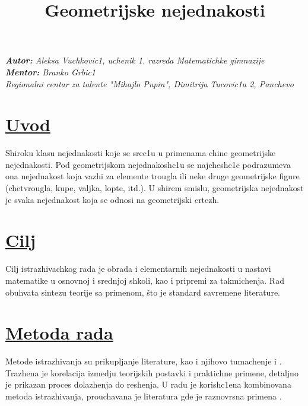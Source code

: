 \documentclass{article}
\title{\textbf{\huge Geometrijske nejednakosti}}
\date{}
\begin{document}
\setlength{\columnsep}{1.2cm}
\maketitle
\begin{center}
\vspace*{-1.5cm}
 \large\textit{\textbf{Autor:} Aleksa Vuchkovic1, uchenik 1. razreda Matematichke gimnazije}\\
    \textit{\textbf{Mentor:} Branko Grbic1}\\
    \normalsize\textit{Regionalni centar za talente "Mihajlo Pupin", Dimitrija Tucovic1a 2, Panchevo}
\end{center}
\begin{multicols}{2}
 \noindent
\section*{\underline{Uvod}}

\large Shiroku klasu nejednakosti koje se srec1u u primenama chine \text geometrijske nejednakosti. Pod geometrijskom nejednakosh$ $c1u se najchesh$ $c1e podrazumeva ona nejednakost koja vazhi za elemente trougla ili neke
druge geometrijske \text figure (chetvrougla, kupe, valjka, lopte, itd.). U shirem smislu, {geometrijska} nejednakost je svaka {nejednakost} koja se odnosi na geometrijski crtezh.
\section*{\underline{Cilj}}
Cilj istrazhivachkog rada je obrada i  elementarnih nejednakosti u
{nastavi} matematike u osnovnoj i \text srednjoj shkoli, kao i pripremi za
\text takmichenja. Rad obuhvata sintezu teorije sa \text primenom, što je standard savremene literature.
\section*{\underline{Metoda rada}}
Metode istrazhivanja su \text prikupljanje lit{erature}, kao i njihovo tumachenje i .
Trazhena je korelacija izmedju teorijskih postavki i \text praktichne
primene, detaljno je prikazan \text proces dolazhenja do reshenja. U radu je
korish$ $c1ena kombinovana metoda \text istrazhivanja, prouchavana je
literatura gde je raznovrsna primena .
\noindent

\end{multicols}
\end{document}
